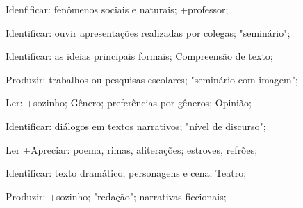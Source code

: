  Idenfificar: fenômenos sociais e naturais; +professor; 

 Identificar: ouvir apresentações realizadas por colegas; "seminário";

 Identificar: as ideias principais formais; Compreensão de texto;

 Produzir: trabalhos ou pesquisas escolares; "seminário com imagem";

 Ler: +sozinho; Gênero; preferências por gêneros; Opinião;

 Identificar: diálogos em textos narrativos; "nível de discurso";

 Ler +Apreciar: poema, rimas, aliterações; estroves, refrões;

 Identificar: texto dramático, personagens e cena; Teatro;

 Produzir: +sozinho; "redação"; narrativas ficcionais;  

